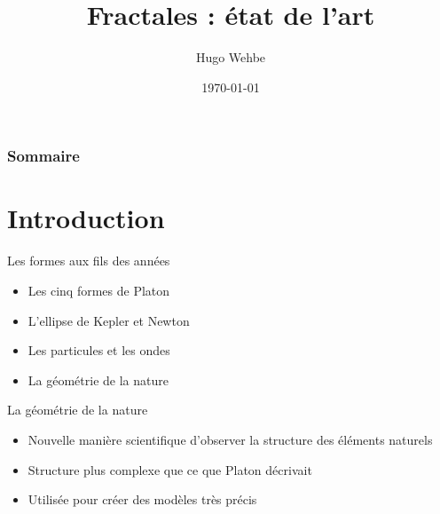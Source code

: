 \documentclass{beamer}
\title[Fractales: état de l'art]{Fractales : état de l'art} %
\author{Hugo Wehbe} %
\date{\today} %
\begin{document}
\begin{frame}
\titlepage %
\end{frame}

\begin{frame}
\frametitle{Sommaire} %
\tableofcontents %
\end{frame}



\section{Introduction}
\begin{frame}{Les formes aux fils des années}
\begin{block}{}
    \begin{itemize}
        \item Les cinq formes de Platon
        \item L'ellipse de Kepler et Newton
        \item Les particules et les ondes
        \item La géométrie de la nature
    \end{itemize}
\end{block}
\end{frame}

\begin{frame}{La géométrie de la nature}
\begin{block}{}
    \begin{itemize}
        \item Nouvelle manière scientifique d'observer la structure des éléments naturels
        \item Structure plus complexe que ce que Platon décrivait
        \item Utilisée pour créer des modèles très précis
    \end{itemize}
\end{block}
\end{frame}
\end{document}

